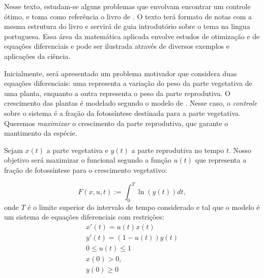 Nesse texto, estudam-se alguns problemas que envolvam encontrar um controle
ótimo, e toma como referência o livro de \cite{lenhart2007}. O texto terá
formato de notas com a mesma estrutura do livro e servirá
de guia introdutório sobre o tema na lingua portuguesa. Essa área da
matemática aplicada envolve estudos de otimização e de equações diferenciais e
pode ser ilustrada através de diversos exemplos e aplicações da ciência. 

Inicialmente, será apresentado um problema motivador que considera duas
equações diferenciais: uma representa a variação do peso da parte vegetativa
de uma planta, enquanto a outra representa o peso da parte reprodutiva. O
crescimento das plantas é modelado segundo o modelo de \cite{cohen1971299}.
Nesse caso, o \textit{controle} sobre o sistema é a fração da fotossíntese destinada para a parte vegetativa. Queremos \textit{maximizar} o 
crescimento da parte reprodutiva, que garante o mantimento da espécie. 

Sejam $x(t)$ a parte vegetativa e $y(t)$ a parte reprodutiva no
tempo $t$. Nosso objetivo será maximizar o funcional 
segundo a função $u(t)$ que representa a fração de fotossíntese para
o crescimento vegetativo: 

\begin{equation}
    \label{funcional-maximize}
    F(x,u,t) := \int_0^T \ln(y(t))dt, 
\end{equation}
onde $T$ é o limite superior do intervalo de tempo considerado e tal que o
modelo é um sistema de equações diferenciais com restrições: 
\begin{gather*}
    x'(t) = u(t)x(t) \\
    y'(t) = (1 - u(t))y(t) \\
    0 \leq u(t) \leq 1 \\
    x(0) > 0, \\
    y(0) \geq 0
\end{gather*}    


